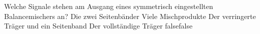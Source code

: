     {Welche Signale stehen am Ausgang eines symmetrisch eingestellten Balancemischers an?}
    {Die zwei Seitenbänder}
    {Viele Mischprodukte}
    {Der verringerte Träger und ein Seitenband}
    {Der vollständige Träger}
    {false}{false}